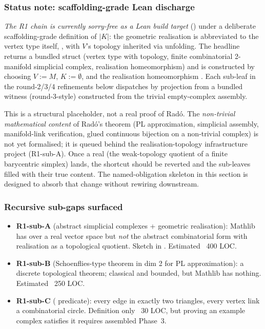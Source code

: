 \subsubsection*{Status note: scaffolding-grade Lean discharge}

\emph{The R1 chain is currently sorry-free as a Lean build target}
() under a deliberate
scaffolding-grade definition of \(|K|\): the geometric realisation is
abbreviated to the vertex type itself,
, with \(V\)'s topology inherited via
 unfolding.  The headline  returns
a bundled  struct (vertex type with
topology, finite combinatorial 2-manifold simplicial complex,
realisation homeomorphism) and is constructed by choosing
\(V := M\), \(K := \emptyset\), and the realisation homeomorphism
.  Each sub-leaf in the round-2/3/4
refinements below dispatches by projection from a bundled
 witness (round-3-style) constructed from the
trivial empty-complex assembly.

This is a structural placeholder, not a real proof of Rad\'o.  The
\emph{non-trivial mathematical content} of Rad\'o's theorem
(PL approximation, simplicial assembly, manifold-link verification,
glued continuous bijection on a non-trivial complex) is not yet
formalised; it is queued behind the realisation-topology
infrastructure project (R1-sub-A).  Once a real 
(the weak-topology quotient of a finite barycentric simplex) lands,
the  shortcut should be reverted and the sub-leaves
filled with their true content.  The named-obligation skeleton in
this section is designed to absorb that change without rewiring
downstream.

\subsubsection*{Recursive sub-gaps surfaced}

\begin{itemize}
\item \textbf{R1-sub-A} (abstract simplicial complexes + geometric
  realisation): Mathlib has  over a real
  vector space but \emph{not} the abstract combinatorial form with
  realisation as a topological quotient.  Sketch in
  .  Estimated
  ~400 LOC.
\item \textbf{R1-sub-B} (Schoenflies-type theorem in dim 2 for PL
  approximation): a discrete topological theorem; classical and
  bounded, but Mathlib has nothing.  Estimated ~250 LOC.
\item \textbf{R1-sub-C} ( predicate):
  every edge in exactly two triangles, every vertex link a
  combinatorial circle.  Definition only ~30 LOC, but proving an
  example complex satisfies it requires assembled Phase~3.
\end{itemize}

